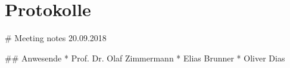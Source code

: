 \section{Protokolle}

\begin{markdown}
# Meeting notes 20.09.2018

## Anwesende
* Prof. Dr. Olaf Zimmermann
* Elias Brunner
* Oliver Dias
\end{markdown}